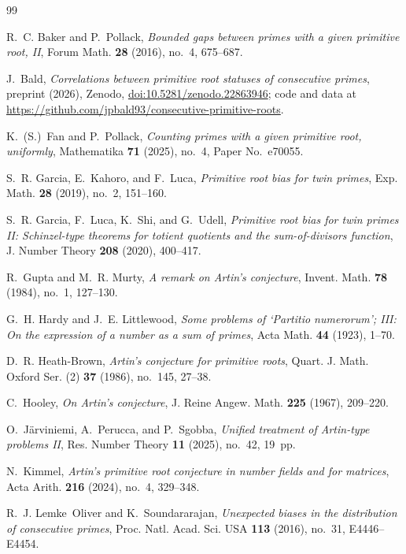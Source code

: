 \documentclass[11pt,reqno]{amsart}
\theoremstyle{plain}
\theoremstyle{definition}
\begin{document}
\begin{thebibliography}{99}

R.~C. Baker and P.~Pollack,
\emph{Bounded gaps between primes with a given primitive root, II},
Forum Math. \textbf{28} (2016), no.~4, 675--687.

J.~Bald,
\emph{Correlations between primitive root statuses of consecutive primes},
preprint (2026), Zenodo,
\href{https://doi.org/10.5281/zenodo.22863946}{doi:10.5281/zenodo.22863946};
code and data at
\url{https://github.com/jpbald93/consecutive-primitive-roots}.

K.~(S.)~Fan and P.~Pollack,
\emph{Counting primes with a given primitive root, uniformly},
Mathematika \textbf{71} (2025), no.~4, Paper No.~e70055.

S.~R. Garcia, E.~Kahoro, and F.~Luca,
\emph{Primitive root bias for twin primes},
Exp. Math. \textbf{28} (2019), no.~2, 151--160.

S.~R. Garcia, F.~Luca, K.~Shi, and G.~Udell,
\emph{Primitive root bias for twin primes II: Schinzel-type theorems for
totient quotients and the sum-of-divisors function},
J. Number Theory \textbf{208} (2020), 400--417.

R.~Gupta and M.~R. Murty,
\emph{A remark on Artin's conjecture},
Invent. Math. \textbf{78} (1984), no.~1, 127--130.

G.~H. Hardy and J.~E. Littlewood,
\emph{Some problems of `Partitio numerorum'; III: On the expression of a
number as a sum of primes},
Acta Math. \textbf{44} (1923), 1--70.

D.~R. Heath-Brown,
\emph{Artin's conjecture for primitive roots},
Quart. J. Math. Oxford Ser. (2) \textbf{37} (1986), no.~145, 27--38.

C.~Hooley,
\emph{On Artin's conjecture},
J. Reine Angew. Math. \textbf{225} (1967), 209--220.

O.~J\"arviniemi, A.~Perucca, and P.~Sgobba,
\emph{Unified treatment of Artin-type problems II},
Res. Number Theory \textbf{11} (2025), no.~42, 19~pp.

N.~Kimmel,
\emph{Artin's primitive root conjecture in number fields and for matrices},
Acta Arith. \textbf{216} (2024), no.~4, 329--348.

R.~J. Lemke~Oliver and K.~Soundararajan,
\emph{Unexpected biases in the distribution of consecutive primes},
Proc. Natl. Acad. Sci. USA \textbf{113} (2016), no.~31, E4446--E4454.


\end{thebibliography}
\end{document}
